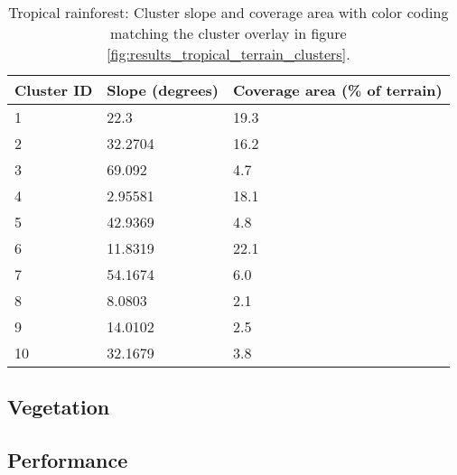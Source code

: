 \begin{table}[h]
  \centering
	    \begin{tabular}{|p{5cm}|p{5cm}|p{5cm}|}
		\hline	
  	    \textbf{Cluster ID} & \textbf{Slope (degrees)} & \textbf{Coverage area (\% of terrain)} \\
  	    \hline	
		\cellcolor{trop_cluster_1} 1 & 22.3 & 19.3 \\
		\hline
		\cellcolor{trop_cluster_2} 2 & 32.2704 & 16.2 \\
		\hline
		\cellcolor{trop_cluster_3} 3 & 69.092 & 4.7 \\
		\hline
		\cellcolor{trop_cluster_4}4 & 2.95581 & 18.1 \\
		\hline
		\cellcolor{trop_cluster_5} 5 & 42.9369 & 4.8 \\
		\hline
		\cellcolor{trop_cluster_6} 6 & 11.8319 & 22.1 \\
		\hline
		\cellcolor{trop_cluster_7} 7 & 54.1674 & 6.0 \\
		\hline
		\cellcolor{trop_cluster_8} 8 & 8.0803 & 2.1 \\
		\hline
		\cellcolor{trop_cluster_9} 9 & 14.0102 & 2.5 \\
		\hline
		\cellcolor{trop_cluster_10} 10 & 32.1679 & 3.8 \\
		\hline
		\end{tabular}
		\caption{Tropical rainforest: Cluster slope and coverage area with color coding matching the cluster overlay in figure \ref{fig:results_tropical_terrain_clusters}.}
	  \label{tab:results_tropical_cluster_slope_covarea}
\end{table}

\subsection{Vegetation}

\subsection{Performance}


